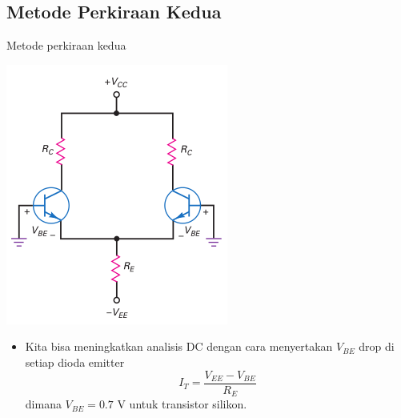 \documentclass[aspectratio=169]{beamer}
\begin{document}
\subsection{Metode Perkiraan Kedua}
\begin{frame}{Metode perkiraan kedua}
	\begin{multicols}{2}
		\begin{center}
			\includegraphics[width=0.7\textheight]{gambar/01.second_approximation}
		\end{center}
		\columnbreak
		\begin{itemize}
			\item Kita bisa meningkatkan analisis DC dengan cara menyertakan $ V_{BE} $ drop di setiap dioda emitter
			\begin{equation} \label{pers.8}
				I_T = \frac{V_{EE} - V_{BE}}{R_E}
			\end{equation}
			dimana $ V_{BE} = 0.7 $ V untuk transistor silikon.
		\end{itemize}
		\vfill\null
	\end{multicols}
\end{frame}
\end{document}
